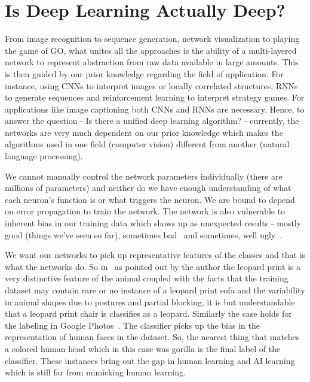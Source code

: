 \documentclass[10pt]{article}
\begin{document}
\section{Is Deep Learning Actually Deep?}
\par From image recognition to sequence generation, network visualization to playing the game of GO, what unites all the approaches is the ability of a multi-layered network to represent abstraction from raw data available in large amounts. This is then guided by our prior knowledge regarding the field of application. For instance, using CNNs to interpret images or locally correlated structures, RNNs to generate sequences and reinforcement learning to interpret strategy games. For applications like image captioning both CNNs and RNNs are necessary. Hence, to answer the question - Is there a unified deep learning algorithm? - currently, the networks are very much dependent on our prior knowledge which makes the algorithms used in one field (computer vision) different from another (natural language processing).
\par We cannot manually control the network parameters individually (there are millions of parameters) and neither do we have enough understanding of what each neuron's function is or what triggers the neuron. We are bound to depend on error propagation to train the network. The network is also vulnerable to inherent bias in our training data which shows up as unexpected results - mostly good (things we've seen so far), sometimes bad~\cite{khurshudov2015suddenly} and sometimes, well ugly~\cite{curtis2015google}.
\par We want our networks to pick up representative features of the classes and that is what the networks do. So in~\cite{khurshudov2015suddenly} as pointed out by the author the leopard print is a very distinctive feature of the animal coupled with the facts that the training dataset may contain rare or no instance of a leopard print sofa and the variability in animal shapes due to postures and partial blocking, it is but understandable that a leopard print chair is classifies as a leopard. Similarly the case holds for the labeling in Google Photos~\cite{curtis2015google}. The classifier picks up the bias in the representation of human faces in the dataset. So, the nearest thing that matches a colored human head which in this case was gorilla is the final label of the classifier. These instances bring out the gap in human learning and AI learning which is still far from mimicking human learning.
\end{document}
